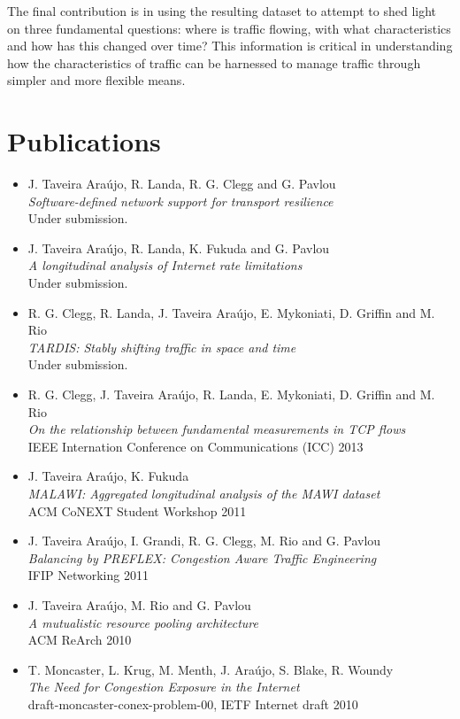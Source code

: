 The final contribution is in using the resulting dataset to attempt to shed light on three fundamental questions: where is traffic flowing, with what characteristics and how has this changed over time? This information is critical in understanding how the characteristics of traffic can be harnessed to manage traffic through simpler and more flexible means.



\section{Publications}
\label{sec:introduction:contributions}

\begin{itemize}
    \item J. Taveira Ara\'{u}jo, R. Landa, R. G. Clegg and G. Pavlou \\
            \emph{Software-defined network support for transport resilience} \\
            Under submission.
    \item J. Taveira Ara\'{u}jo, R. Landa, K. Fukuda and G. Pavlou \\
            \emph{A longitudinal analysis of Internet rate limitations} \\
            Under submission.
    \item R. G. Clegg, R. Landa, J. Taveira Ara\'{u}jo, E. Mykoniati, D. Griffin and M. Rio \\
            \emph{TARDIS: Stably shifting traffic in space and time} \\
            Under submission.
    \item R. G. Clegg, J. Taveira Ara\'{u}jo, R. Landa, E. Mykoniati, D. Griffin and M. Rio \\
            \emph{On the relationship between fundamental measurements in TCP flows} \\
            {IEEE Internation Conference on Communications (ICC) 2013}
    \item J. Taveira Ara\'{u}jo, K. Fukuda \\
            \emph{MALAWI: Aggregated longitudinal analysis of the MAWI dataset} \\
            {ACM CoNEXT Student Workshop 2011}
    \item J. Taveira Ara\'{u}jo, I. Grandi, R. G. Clegg, M. Rio and G. Pavlou \\
            \emph{Balancing by PREFLEX: Congestion Aware Traffic Engineering} \\
            {IFIP Networking 2011}
    \item J. Taveira Ara\'{u}jo, M. Rio and G. Pavlou \\
        \emph{A mutualistic resource pooling architecture} \\
        {ACM ReArch 2010}
    \item T. Moncaster, L. Krug, M. Menth, J. Ara\'{u}jo, S. Blake, R. Woundy \\
        \emph{The Need for Congestion Exposure in the Internet} \\
        {draft-moncaster-conex-problem-00, IETF Internet draft 2010}
\end{itemize}

